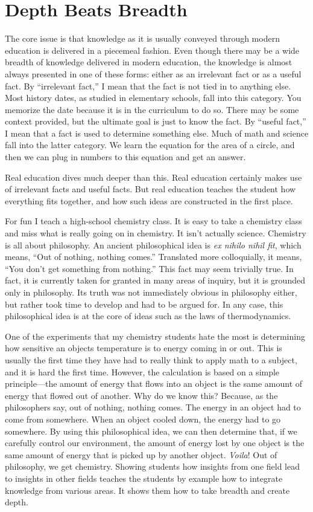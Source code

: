 \section{Depth Beats Breadth}

The core issue is that knowledge as it is usually conveyed through
modern education is delivered in a piecemeal fashion. Even though there
may be a wide breadth of knowledge delivered in modern education, the
knowledge is almost always presented in one of these forms: either as
an irrelevant fact or as a useful fact. By “irrelevant fact,” I mean
that the fact is not tied in to anything else. Most history dates, as
studied in elementary schools, fall into this category. You memorize
the date because it is in the curriculum to do so. There may be some
context provided, but the ultimate goal is just to know the fact. By
“useful fact,” I mean that a fact is used to determine something else.
Much of math and science fall into
the latter category.
We learn the equation for the area of a circle, and then we can plug in
numbers to this equation and get an answer.

Real education dives
much deeper than this. Real education certainly makes use of irrelevant
facts and useful facts. But real education teaches the student how
everything fits
together, and how such ideas are constructed in the first place.

For fun I teach a high-school chemistry class. It is easy to take a
chemistry class and miss what is really going on in chemistry. It isn’t
actually science. Chemistry is all about philosophy. An ancient
philosophical idea is \textit{ex nihilo nihil fit}, which means, “Out
of nothing, nothing comes.” Translated more colloquially, it means,
“You don’t get something from nothing.”  This fact may seem trivially
true. In fact, it is currently taken for granted in many areas of
inquiry, but it is
grounded only in philosophy. Its truth was not immediately obvious in
philosophy either, but rather took time to develop and had to be argued
for. In any case, this philosophical idea is at the core of ideas such
as the laws of thermodynamics. 

One of the experiments that my chemistry students hate the most is
determining how sensitive an object{\textquotesingle}s temperature is
to energy coming in or out. This is usually the first time they have
had to really think to apply math to a subject, and it is hard the
first time. However, the calculation is based on a simple principle—the
amount of energy that flows into an object is the same amount of energy
that flowed out of another. Why do we know this? Because, as the
philosophers say, out of nothing, nothing comes. The energy in an
object had to come from somewhere. When an object cooled down, the
energy had to go somewhere. By using this philosophical idea, we can
then determine that, if we carefully control our environment, the
amount of energy lost by one object is the same amount of energy that
is picked up by another object. \textit{Voila}! Out of philosophy, we
get chemistry. Showing students how insights from one field lead to
insights in other fields teaches the students by example how to
integrate knowledge from various areas. It shows them how to take
breadth and create depth.


